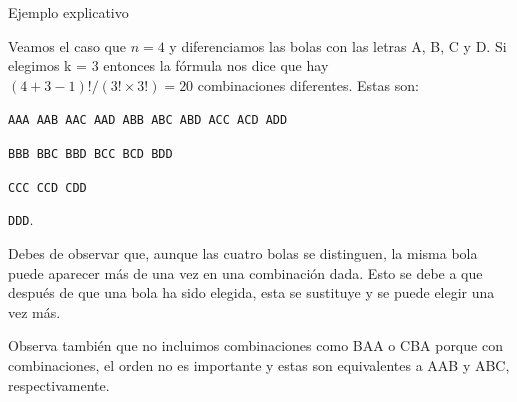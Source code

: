 \documentclass[10pt]{beamer}
\begin{document}
\begin{frame}{Ejemplo explicativo}
	
Veamos el caso que  $n = 4$  y diferenciamos las bolas con las letras  A, B, C y D. Si elegimos k = 3 entonces la f\'ormula nos dice que hay $(4+ 3- 1)!/(3! \times 3!) = 20$ combinaciones diferentes. Estas son:



\qquad \qquad \texttt{AAA   AAB   AAC   AAD  ABB  ABC  ABD   ACC  ACD   ADD}

\qquad \qquad \texttt{BBB  BBC  BBD   BCC  BCD   BDD}

\qquad \qquad \texttt{CCC  CCD   CDD}

\qquad \qquad \texttt{DDD}.


\vspace{0.2cm}

\small{Debes de observar  que, aunque las cuatro bolas se distinguen, la misma bola puede aparecer m\'as de una vez en una combinaci\'on dada. Esto se debe a que despu\'es de que una bola ha sido elegida, esta  se sustituye y se puede elegir una vez m\'as.
	
 Observa  tambi\'en que no incluimos combinaciones como BAA o CBA porque con combinaciones, el orden no es importante y estas son equivalentes a AAB y ABC, respectivamente.}
\end{frame}
\end{document}
